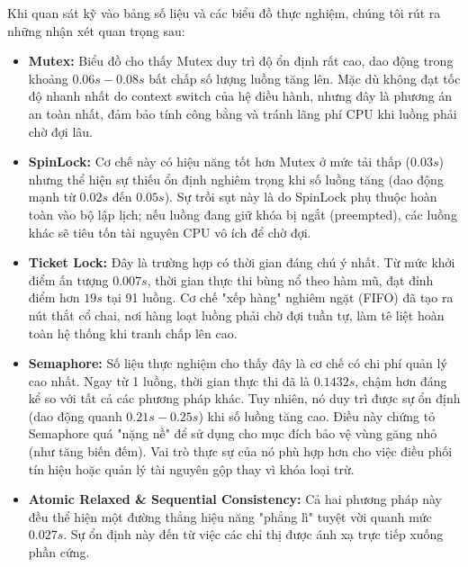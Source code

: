 Khi quan sát kỹ vào bảng số liệu và các biểu đồ thực nghiệm, chúng tôi rút ra những nhận xét quan trọng sau:

\begin{itemize}
       \item \textbf{Mutex:} Biểu đồ cho thấy Mutex duy trì độ ổn định rất cao, dao động trong khoảng $0.06s - 0.08s$ bất chấp số lượng luồng tăng lên. Mặc dù không đạt tốc độ nhanh nhất do context switch của hệ điều hành, nhưng đây là phương án an toàn nhất, đảm bảo tính công bằng và tránh lãng phí CPU khi luồng phải chờ đợi lâu.
    
    \item \textbf{SpinLock:} Cơ chế này có hiệu năng tốt hơn Mutex ở mức tải thấp ($0.03s$) nhưng thể hiện sự thiếu ổn định nghiêm trọng khi số luồng tăng (dao động mạnh từ $0.02s$ đến $0.05s$). Sự trồi sụt này là do SpinLock phụ thuộc hoàn toàn vào bộ lập lịch; nếu luồng đang giữ khóa bị ngắt (preempted), các luồng khác sẽ tiêu tốn tài nguyên CPU vô ích để chờ đợi.
    
    \item \textbf{Ticket Lock:} Đây là trường hợp có thời gian đáng chú ý nhất. Từ mức khởi điểm ấn tượng $0.007s$, thời gian thực thi bùng nổ theo hàm mũ, đạt đỉnh điểm hơn $19s$ tại 91 luồng. Cơ chế "xếp hàng" nghiêm ngặt (FIFO) đã tạo ra nút thắt cổ chai, nơi hàng loạt luồng phải chờ đợi tuần tự, làm tê liệt hoàn toàn hệ thống khi tranh chấp lên cao.

    \item \textbf{Semaphore:} Số liệu thực nghiệm cho thấy đây là cơ chế có chi phí quản lý cao nhất. Ngay từ 1 luồng, thời gian thực thi đã là $0.1432s$, chậm hơn đáng kể so với tất cả các phương pháp khác. Tuy nhiên, nó duy trì được sự ổn định (dao động quanh $0.21s - 0.25s$) khi số luồng tăng cao. Điều này chứng tỏ Semaphore quá "nặng nề" để sử dụng cho mục đích bảo vệ vùng găng nhỏ (như tăng biến đếm). Vai trò thực sự của nó phù hợp hơn cho việc điều phối tín hiệu hoặc quản lý tài nguyên gộp thay vì khóa loại trừ.
\end{itemize}

\begin{itemize}
    \item \textbf{Atomic Relaxed \& Sequential Consistency:} Cả hai phương pháp này đều thể hiện một đường thẳng hiệu năng "phẳng lì" tuyệt vời quanh mức $0.027s$. Sự ổn định này đến từ việc các chỉ thị được ánh xạ trực tiếp xuống phần cứng.
\end{itemize}


